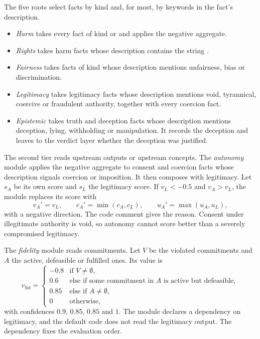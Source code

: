 The five roots select facts by kind and, for most, by keywords in the fact's description.
\begin{itemize}
\item \emph{Harm} takes every fact of kind  or  and applies the
negative aggregate.
\item \emph{Rights} takes harm facts whose description contains the string .
\item \emph{Fairness} takes facts of kind  whose description mentions unfairness,
bias or discrimination.
\item \emph{Legitimacy} takes legitimacy facts whose description mentions void, tyrannical,
coercive or fraudulent authority, together with every coercion fact.
\item \emph{Epistemic} takes truth and deception facts whose description mentions deception,
lying, withholding or manipulation. It records the deception and leaves to the verdict layer
whether the deception was justified.
\end{itemize}

The second tier reads upstream outputs or upstream concepts. The \emph{autonomy} module applies the
negative aggregate to consent and coercion facts whose description signals coercion or imposition.
It then composes with legitimacy. Let $s_A$ be its own score and $s_L$ the legitimacy score. If
$v_L < -0.5$ and $v_A > v_L$, the module replaces its score with
\begin{equation}
v_A' = v_L, \qquad c_A' = \min(c_A, c_L), \qquad u_A' = \max(u_A, u_L),
\label{eq:compiler-autonomy}
\end{equation}
with a negative direction. The code comment gives the reason. Consent under illegitimate authority
is void, so autonomy cannot score better than a severely compromised legitimacy.

The \emph{fidelity} module reads commitments. Let $V$ be the violated commitments and $A$ the
active, defeasible or fulfilled ones. Its value is
\begin{equation}
v_{\mathrm{fid}} =
\begin{cases}
-0.8 & \text{if } V \neq \emptyset,\\
0.6 & \text{else if some commitment in } A \text{ is active but defeasible},\\
0.85 & \text{else if } A \neq \emptyset,\\
0 & \text{otherwise,}
\end{cases}
\label{eq:compiler-fidelity}
\end{equation}
with confidences $0.9$, $0.85$, $0.85$ and $1$. The module declares a dependency on legitimacy,
and the default code does not read the legitimacy output. The dependency fixes the evaluation
order.

